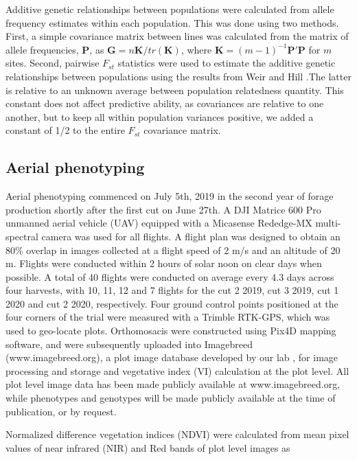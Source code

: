 \documentclass[12pt, letterpaper]{article}
\begin{document}
Additive genetic relationships between populations were calculated from allele frequency estimates within each population. This was done using two methods. First, a simple covariance matrix between lines was calculated from the matrix of allele frequencies, $\mathbf{P}$, as $\mathbf{G} = n\mathbf{K} / tr(\mathbf{K})$, where $\mathbf{K} = (m-1)^{-1}\mathbf{P}'\mathbf{P}$ for $m$ sites. Second, pairwise $F_{st}$ statistics were used to estimate the additive genetic relationships between populations using the results from Weir and Hill \parencite*[equation 7;][]{weir2002}.The latter is relative to an unknown average between population relatedness quantity. This constant does not affect predictive ability, as covariances are relative to one another, but to keep all within population variances positive, we added a constant of 1/2 to the entire $F_{st}$ covariance matrix.

\subsection{Aerial phenotyping}

Aerial phenotyping commenced on July 5th, 2019 in the second year of forage production shortly after the first cut on June 27th. A DJI Matrice 600 Pro unmanned aerial vehicle (UAV) equipped with a Micasense Rededge-MX multi-spectral camera was used for all flights. A flight plan was designed to obtain an 80\% overlap in images collected at a flight speed of 2 m/s and an altitude of 20 m. Flights were conducted within 2 hours of solar noon on clear days when possible. A total of 40 flights were conducted on average every 4.3 days across four harvests, with 10, 11, 12 and 7 flights for the cut 2 2019, cut 3 2019, cut 1 2020 and cut 2 2020, respectively. Four ground control points positioned at the four corners of the trial were measured with a Trimble RTK-GPS, which was used to geo-locate plots. Orthomosacis were constructed using Pix4D mapping software, and were subsequently uploaded into Imagebreed (www.imagebreed.org), a plot image database developed by our lab \parencite{morales2020}, for image processing and storage and vegetative index (VI) calculation at the plot level. All plot level image data has been made publicly available at www.imagebreed.org, while phenotypes and genotypes will be made publicly available at the time of publication, or by request.


Normalized difference vegetation indices (NDVI) were calculated from mean pixel values of near infrared (NIR) and Red bands of plot level images as
\end{document}
